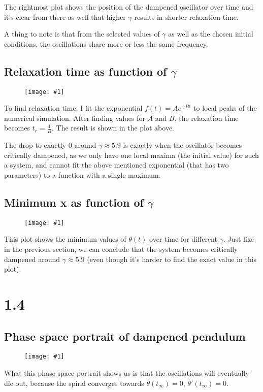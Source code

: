 \documentclass[11pt]{article}
\newcommand{\singlefigure}[1]{
\begin{figure}[H]
  \centering
  \begin{minipage}{0.4\textwidth}
    \centering
    \texttt{[image: \#1]}
  \end{minipage}
\end{figure}
}
\begin{document}
The rightmost plot shows the position of the dampened oscillator over time and it's clear from there as well that higher $\gamma$ results in shorter relaxation time.

A thing to note is that from the selected values of $\gamma$ as well as the chosen initial conditions, the oscillations share more or less the same frequency.

\pagebreak
\begin{multicols}{2}
\subsection*{Relaxation time as function of $\gamma$}
\singlefigure{./plots/1_3/study.png}
To find relaxation time, I fit the exponential $f(t) = A e^{-Bt}$ to local peaks of the numerical simulation.
After finding values for $A$ and $B$, the relaxation time becomes $t_r = \frac{1}{B}$. The result is shown in the plot above.

The drop to exactly 0 around $\gamma\approx 5.9$ is exactly when the oscillator becomes critically dampened, as we only have one local maxima (the initial value) for such a system, and cannot fit the above mentioned exponential (that has two parameters) to a function with a single maximum. 
\columnbreak
\subsection*{Minimum x as function of $\gamma$}
\singlefigure{./plots/1_3/study_2.png}
This plot shows the minimum values of $\theta (t)$ over time for different $\gamma$. Just like in the previous section, we can conclude that the system becomes critically dampened around $\gamma \approx 5.9$ (even though it's harder to find the exact value in this plot).
\end{multicols}

\section*{1.4}
\subsection*{Phase space portrait of dampened pendulum}
\singlefigure{./plots/1_4/study.png}
What this phase space portrait shows us is that the oscillations will eventually die out, because the spiral converges towards $\theta(t_\infty) = 0$, $\theta'(t_\infty) = 0$.

\pagebreak
\end{document}
